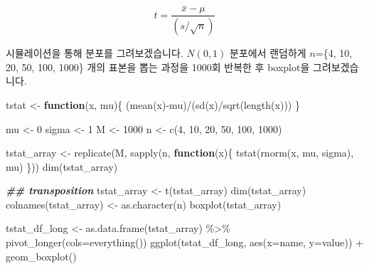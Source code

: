 \documentclass[
]{book}
\newenvironment{Shaded}{\begin{snugshade}}{\end{snugshade}}
\newcommand{\AttributeTok}[1]{\textcolor[rgb]{0.77,0.63,0.00}{#1}}
\newcommand{\ControlFlowTok}[1]{\textcolor[rgb]{0.13,0.29,0.53}{\textbf{#1}}}
\newcommand{\DecValTok}[1]{\textcolor[rgb]{0.00,0.00,0.81}{#1}}
\newcommand{\DocumentationTok}[1]{\textcolor[rgb]{0.56,0.35,0.01}{\textbf{\textit{#1}}}}
\newcommand{\FunctionTok}[1]{\textcolor[rgb]{0.00,0.00,0.00}{#1}}
\newcommand{\NormalTok}[1]{#1}
\newcommand{\OtherTok}[1]{\textcolor[rgb]{0.56,0.35,0.01}{#1}}
\newcommand{\SpecialCharTok}[1]{\textcolor[rgb]{0.00,0.00,0.00}{#1}}
\begin{document}
\[ 
t = \frac{\bar{x} - \mu}{(s/\sqrt{n})}
\]

시뮬레이션을 통해 분포를 그려보겠습니다. \(N(0,1)\) 분포에서 랜덤하게 \(n\)=\{4, 10, 20, 50, 100, 1000\} 개의 표본을 뽑는 과정을 1000회 반복한 후 boxplot을 그려보겠습니다.

\begin{Shaded}
\begin{Highlighting}[]
\NormalTok{tstat }\OtherTok{\textless{}{-}} \ControlFlowTok{function}\NormalTok{(x, mu)\{}
\NormalTok{  (}\FunctionTok{mean}\NormalTok{(x)}\SpecialCharTok{{-}}\NormalTok{mu)}\SpecialCharTok{/}\NormalTok{(}\FunctionTok{sd}\NormalTok{(x)}\SpecialCharTok{/}\FunctionTok{sqrt}\NormalTok{(}\FunctionTok{length}\NormalTok{(x)))}
\NormalTok{\}}

\NormalTok{mu }\OtherTok{\textless{}{-}} \DecValTok{0}
\NormalTok{sigma }\OtherTok{\textless{}{-}} \DecValTok{1}
\NormalTok{M }\OtherTok{\textless{}{-}} \DecValTok{1000}
\NormalTok{n }\OtherTok{\textless{}{-}} \FunctionTok{c}\NormalTok{(}\DecValTok{4}\NormalTok{, }\DecValTok{10}\NormalTok{, }\DecValTok{20}\NormalTok{, }\DecValTok{50}\NormalTok{, }\DecValTok{100}\NormalTok{, }\DecValTok{1000}\NormalTok{)}

\NormalTok{tstat\_array }\OtherTok{\textless{}{-}} \FunctionTok{replicate}\NormalTok{(M, }
                         \FunctionTok{sapply}\NormalTok{(n, }\ControlFlowTok{function}\NormalTok{(x)\{}
                           \FunctionTok{tstat}\NormalTok{(}\FunctionTok{rnorm}\NormalTok{(x, mu, sigma), mu)}
\NormalTok{                           \}))}
\FunctionTok{dim}\NormalTok{(tstat\_array)}

\DocumentationTok{\#\# transposition}
\NormalTok{tstat\_array }\OtherTok{\textless{}{-}} \FunctionTok{t}\NormalTok{(tstat\_array)}
\FunctionTok{dim}\NormalTok{(tstat\_array)}
\FunctionTok{colnames}\NormalTok{(tstat\_array) }\OtherTok{\textless{}{-}} \FunctionTok{as.character}\NormalTok{(n)}
\FunctionTok{boxplot}\NormalTok{(tstat\_array)}

\NormalTok{tstat\_df\_long }\OtherTok{\textless{}{-}} \FunctionTok{as.data.frame}\NormalTok{(tstat\_array) }\SpecialCharTok{\%\textgreater{}\%} 
  \FunctionTok{pivot\_longer}\NormalTok{(}\AttributeTok{cols=}\FunctionTok{everything}\NormalTok{())}
\FunctionTok{ggplot}\NormalTok{(tstat\_df\_long, }\FunctionTok{aes}\NormalTok{(}\AttributeTok{x=}\NormalTok{name, }\AttributeTok{y=}\NormalTok{value)) }\SpecialCharTok{+}
  \FunctionTok{geom\_boxplot}\NormalTok{()}


\end{Highlighting}
\end{Shaded}
\end{document}
